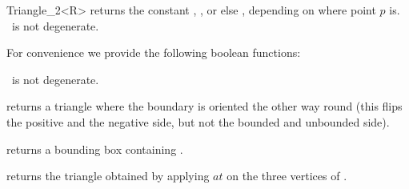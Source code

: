 \begin{ccRefClass} {Triangle_2<R>}
       {returns the constant ,
        , or else
        ,
        depending on where point $p$ is.
        \ccPrecond \ccVar\ is not degenerate.}

For convenience we provide the following boolean functions:

       {}
\ccGlue
{}
       {}
\ccGlue
{}
       {}
\ccGlue
{}
       {} 
\ccGlue
{}
       {\ccPrecond \ccVar\ is not degenerate.}


       {returns a triangle where the boundary is oriented the other
        way round (this flips the positive and the negative side, but
        not the bounded and unbounded side).}

       {returns a bounding box containing \ccVar.}

       {returns the triangle obtained by applying $at$ on the three
        vertices of \ccVar.}


\end{ccRefClass} 
